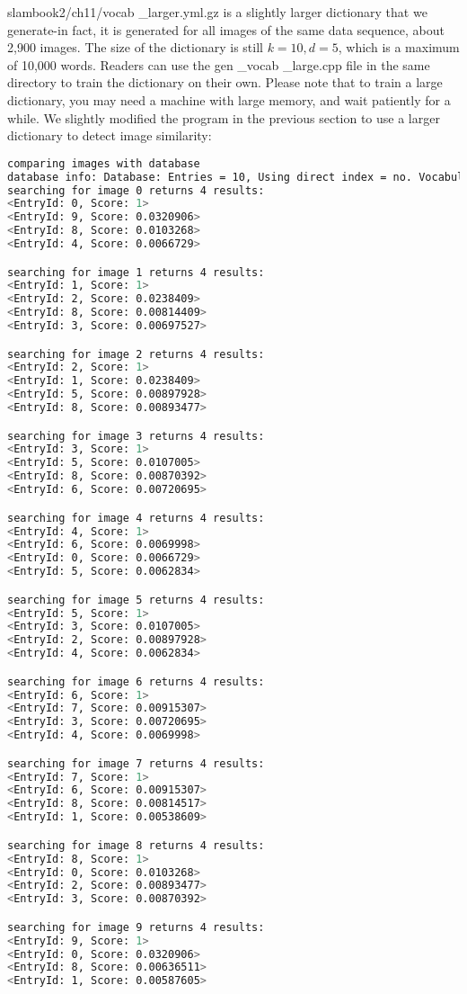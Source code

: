 slambook2/ch11/vocab \_larger.yml.gz is a slightly larger dictionary that we generate-in fact, it is generated for all images of the same data sequence, about 2,900 images. The size of the dictionary is still $k = 10, d = 5 $, which is a maximum of 10,000 words. Readers can use the gen \_vocab \_large.cpp file in the same directory to train the dictionary on their own. Please note that to train a large dictionary, you may need a machine with large memory, and wait patiently for a while. We slightly modified the program in the previous section to use a larger dictionary to detect image similarity:
\begin{lstlisting}[language=sh,caption=终端输出：]
comparing images with database 
database info: Database: Entries = 10, Using direct index = no. Vocabulary: k = 10, L = 5, Weighting = tf-idf, Scoring = L1-norm, Number of words = 99566
searching for image 0 returns 4 results:
<EntryId: 0, Score: 1>
<EntryId: 9, Score: 0.0320906>
<EntryId: 8, Score: 0.0103268>
<EntryId: 4, Score: 0.0066729>

searching for image 1 returns 4 results:
<EntryId: 1, Score: 1>
<EntryId: 2, Score: 0.0238409>
<EntryId: 8, Score: 0.00814409>
<EntryId: 3, Score: 0.00697527>

searching for image 2 returns 4 results:
<EntryId: 2, Score: 1>
<EntryId: 1, Score: 0.0238409>
<EntryId: 5, Score: 0.00897928>
<EntryId: 8, Score: 0.00893477>

searching for image 3 returns 4 results:
<EntryId: 3, Score: 1>
<EntryId: 5, Score: 0.0107005>
<EntryId: 8, Score: 0.00870392>
<EntryId: 6, Score: 0.00720695>

searching for image 4 returns 4 results:
<EntryId: 4, Score: 1>
<EntryId: 6, Score: 0.0069998>
<EntryId: 0, Score: 0.0066729>
<EntryId: 5, Score: 0.0062834>

searching for image 5 returns 4 results:
<EntryId: 5, Score: 1>
<EntryId: 3, Score: 0.0107005>
<EntryId: 2, Score: 0.00897928>
<EntryId: 4, Score: 0.0062834>

searching for image 6 returns 4 results:
<EntryId: 6, Score: 1>
<EntryId: 7, Score: 0.00915307>
<EntryId: 3, Score: 0.00720695>
<EntryId: 4, Score: 0.0069998>

searching for image 7 returns 4 results:
<EntryId: 7, Score: 1>
<EntryId: 6, Score: 0.00915307>
<EntryId: 8, Score: 0.00814517>
<EntryId: 1, Score: 0.00538609>

searching for image 8 returns 4 results:
<EntryId: 8, Score: 1>
<EntryId: 0, Score: 0.0103268>
<EntryId: 2, Score: 0.00893477>
<EntryId: 3, Score: 0.00870392>

searching for image 9 returns 4 results:
<EntryId: 9, Score: 1>
<EntryId: 0, Score: 0.0320906>
<EntryId: 8, Score: 0.00636511>
<EntryId: 1, Score: 0.00587605>
\end{lstlisting}

